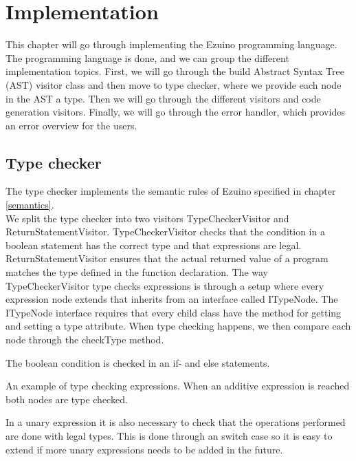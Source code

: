 \chapter{Implementation}
This chapter will go through implementing the Ezuino programming language. The programming language is done, and we can group the different implementation topics. First, we will go through the build Abstract Syntax Tree (AST) visitor class and then move to type checker, where we provide each node in the AST a type. Then we will go through the different visitors and code generation visitors. Finally, we will go through the error handler, which provides an error overview for the users.
\section{Type checker}
The type checker implements the semantic rules of Ezuino specified in chapter \ref{semantics}. \\
We split the type checker into two visitors TypeCheckerVisitor and ReturnStatementVisitor. TypeCheckerVisitor checks that the condition in a boolean statement has the correct type and that expressions are legal. ReturnStatementVisitor ensures that the actual returned value of a program matches the type defined in the function declaration.
The way TypeCheckerVisitor type checks expressions is through a setup where every expression node extends that inherits from an interface called ITypeNode. The ITypeNode interface requires that every child class have the method for getting and setting a type attribute. When type checking happens, we then compare each node through the checkType method.

\noindent\newline

The boolean condition is checked in an if- and else statements.

\noindent\newline

An example of type checking expressions. When an additive expression is reached both nodes are type checked.

\noindent\newline

In a unary expression it is also necessary to check that the operations performed are done with legal types. This is done through an switch case so it is easy to extend if more unary expressions needs to be added in the future. 

\noindent\newline

